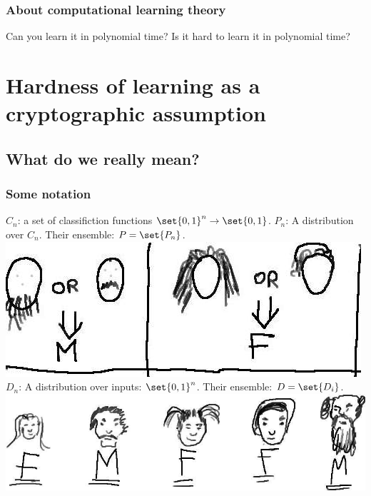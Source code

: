 \documentclass{beamer}
\begin{document}
\begin{frame}
\frametitle{About computational learning theory}
\begin{itemize}
\pitem Can you learn it in polynomial time?
\pitem Is it hard to learn it in polynomial time?
\end{itemize}
\end{frame}

\section{Hardness of learning as a cryptographic assumption}
\subsection{What do we really mean?}
\begin{frame}
\frametitle{Some notation}
\begin{itemize}
\pitem $C_{n}$: a set of classifiction functions $\set{0, 1}^{n} \to \set{0, 1}$.
\pitem $P_{n}$: A distribution over $C_{n}$. Their ensemble: $P = \set{P_{n}}$. \includegraphics[scale=0.15]{images/concepts.jpg}
\pitem $D_{n}$: A distribution over inputs: $\set{0,1}^{n}$. Their ensemble: $D = \set{D_{i}}$.\\
\includegraphics[scale=0.15]{images/classifiedFaces.jpg}
\end{itemize}
\end{frame}
\end{document}

